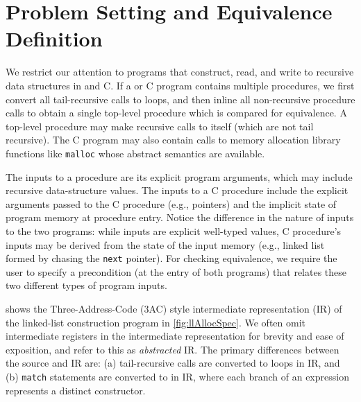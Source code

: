 \section{Problem Setting and Equivalence Definition}
\label{sec:problem-setting}
We restrict
our attention to programs that construct, read, and write to recursive
data structures in \SpecL{} and C.
If a \SpecL{} or C program contains multiple procedures, we first
convert all tail-recursive calls to loops, and then inline
all non-recursive procedure calls to obtain a single top-level procedure which is
compared for equivalence.
A top-level procedure
may make recursive calls to itself (which are not tail recursive).
The C program
may also contain calls to memory allocation library functions
like {\tt malloc} whose
abstract semantics are available.

The inputs to
a \SpecL{} procedure
are its explicit program arguments, which may include
recursive data-structure values.  The inputs to a
C procedure include the explicit arguments passed to the C procedure (e.g., pointers)
and the implicit state of program memory at procedure entry.
Notice the difference in the nature of inputs to the two programs: while
\SpecL{} inputs are explicit well-typed values, C procedure's
inputs may be
derived from the state of the input memory (e.g., linked list formed by chasing the
{\tt next} pointer).
For checking equivalence, we require
the user to specify a precondition (at the entry of both
programs) that relates these two different
types of program inputs.

 shows the Three-Address-Code (3AC) style
intermediate representation (IR) of the linked-list construction \SpecL{}
program in \cref{fig:llAllocSpec}.
We often omit intermediate registers in the intermediate representation
for brevity and ease of exposition, and refer to this as {\em abstracted} IR.
The primary differences between
the \SpecL{} source and IR are: (a) tail-recursive calls
are converted to loops in IR, and (b) {\tt match} statements
are converted to \sumDtor{} in IR,
where each branch of an \sumDtor{}
expression represents a distinct constructor.

